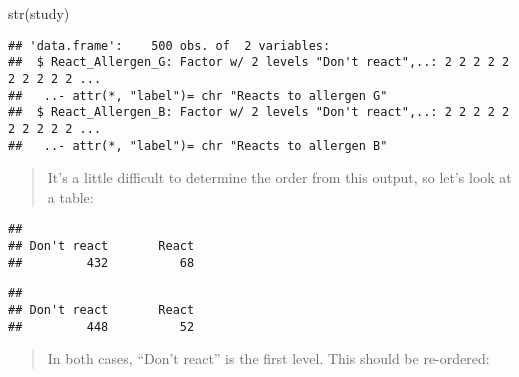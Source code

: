 \documentclass[
]{memoir}
\newenvironment{Shaded}{\begin{snugshade}}{\end{snugshade}}
\newcommand{\AttributeTok}[1]{\textcolor[rgb]{0.77,0.63,0.00}{#1}}
\newcommand{\FunctionTok}[1]{\textcolor[rgb]{0.00,0.00,0.00}{#1}}
\newcommand{\NormalTok}[1]{#1}
\newcommand{\OtherTok}[1]{\textcolor[rgb]{0.56,0.35,0.01}{#1}}
\newcommand{\SpecialCharTok}[1]{\textcolor[rgb]{0.00,0.00,0.00}{#1}}
\newcommand{\StringTok}[1]{\textcolor[rgb]{0.31,0.60,0.02}{#1}}
\begin{document}
\begin{Shaded}
\begin{Highlighting}[]
\FunctionTok{str}\NormalTok{(study)}
\end{Highlighting}
\end{Shaded}

\begin{verbatim}
## 'data.frame':    500 obs. of  2 variables:
##  $ React_Allergen_G: Factor w/ 2 levels "Don't react",..: 2 2 2 2 2 2 2 2 2 2 ...
##   ..- attr(*, "label")= chr "Reacts to allergen G"
##  $ React_Allergen_B: Factor w/ 2 levels "Don't react",..: 2 2 2 2 2 2 2 2 2 2 ...
##   ..- attr(*, "label")= chr "Reacts to allergen B"
\end{verbatim}

\begin{quote}
It's a little difficult to determine the order from this output, so let's look at a table:
\end{quote}

\begin{Shaded}
\end{Shaded}

\begin{verbatim}
## 
## Don't react       React 
##         432          68
\end{verbatim}

\begin{Shaded}
\end{Shaded}

\begin{verbatim}
## 
## Don't react       React 
##         448          52
\end{verbatim}

\begin{quote}
In both cases, ``Don't react'' is the first level. This should be re-ordered:
\end{quote}

\begin{Shaded}
\end{Shaded}
\end{document}

